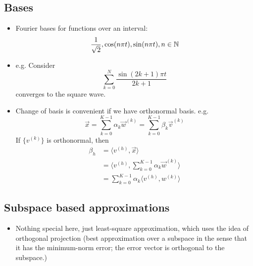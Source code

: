 \documentclass[../main.tex]{subfiles}
\begin{document}
\subsection*{Bases}
\begin{itemize}
    \item Fourier bases for functions over an interval: \[
    \frac{1}{\sqrt{2}}, \cos(n\pi t), \sin(n\pi t), n\in \mathbb{N}
    \]
    \item e.g. Consider \[
    \sum_{k=0}^N\frac{\sin(2k+1)\pi t}{2k+1}
    \] converges to the square wave.
    \item Change of basis is convenient if we have orthonormal basis. e.g. \[
    \vec x = \sum_{k=0}^{K-1}\alpha_k \vec w^{(k)}=\sum_{k=0}^{K-1}\beta_k\vec v^{(k)}
    \]
    If $\{v^{(k)}\}$ is orthonormal, then \begin{align*}
        \beta_h &=\langle v^{(h)}, \vec x\rangle\\
        &=\langle v^{(h)},\sum_{k=0}^{K-1}\alpha_k \vec w^{(k)} \rangle\\
        &=\sum_{k=0}^{K-1}\alpha_k\langle v^{(h)},w^{(k)}\rangle
    \end{align*}
\end{itemize}
\subsection{Subspace based approximations}
\begin{itemize}
    \item Nothing special here, just least-square approximation, which uses the idea of orthogonal projection (best approximation over a subspace in the sense that it has the minimum-norm error; the error vector is orthogonal to the subspace.)
\end{itemize}
\end{document}

